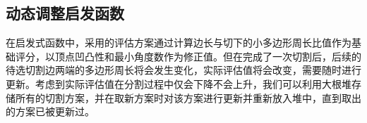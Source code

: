 \subsection{动态调整启发函数}
在启发式函数中，采用的评估方案通过计算边长与切下的小多边形周长比值作为基础评分，以顶点凹凸性和最小角度数作为修正值。但在完成了一次切割后，后续的待选切割边两端的多边形周长将会发生变化，实际评估值将会改变，需要随时进行更新。考虑到实际评估值在分割过程中仅会下降不会上升，我们可以利用大根堆存储所有的切割方案，并在取新方案时对该方案进行更新并重新放入堆中，直到取出的方案已被更新过。








